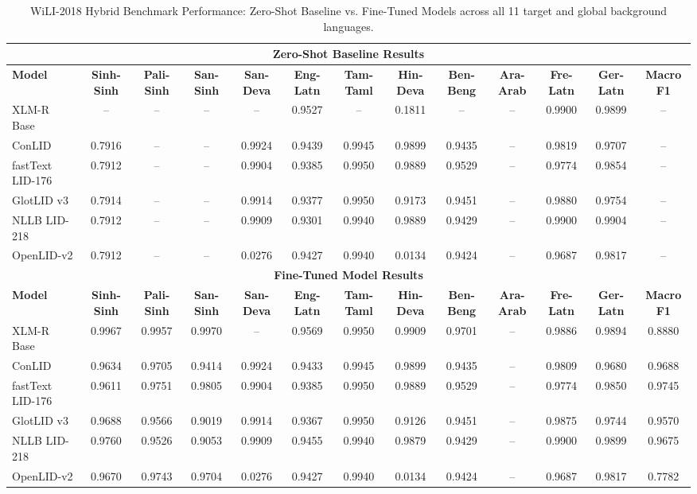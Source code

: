 \documentclass[11pt]{article}
\begin{document}
\begin{table}[p]
\vspace{12pt}

\caption{WiLI-2018 Hybrid Benchmark Performance: Zero-Shot Baseline vs. Fine-Tuned Models across all 11 target and global background languages.}
\label{tab:wili_full}
\begin{tabular}{l ccc cccccccc c}
\toprule
\multicolumn{13}{c}{\textbf{Zero-Shot Baseline Results}} \\
\midrule
\textbf{Model} & \textbf{Sinh-Sinh} & \textbf{Pali-Sinh} & \textbf{San-Sinh} & \textbf{San-Deva} & \textbf{Eng-Latn} & \textbf{Tam-Taml} & \textbf{Hin-Deva} & \textbf{Ben-Beng} & \textbf{Ara-Arab} & \textbf{Fre-Latn} & \textbf{Ger-Latn} & \textbf{Macro F1} \\
\midrule
XLM-R Base & -- & -- & -- & -- & 0.9527 & -- & 0.1811 & -- & -- & 0.9900 & 0.9899 & -- \\
ConLID & 0.7916 & -- & -- & 0.9924 & 0.9439 & 0.9945 & 0.9899 & 0.9435 & -- & 0.9819 & 0.9707 & -- \\
fastText LID-176 & 0.7912 & -- & -- & 0.9904 & 0.9385 & 0.9950 & 0.9889 & 0.9529 & -- & 0.9774 & 0.9854 & -- \\
GlotLID v3 & 0.7914 & -- & -- & 0.9914 & 0.9377 & 0.9950 & 0.9173 & 0.9451 & -- & 0.9880 & 0.9754 & -- \\
NLLB LID-218 & 0.7912 & -- & -- & 0.9909 & 0.9301 & 0.9940 & 0.9889 & 0.9429 & -- & 0.9900 & 0.9904 & -- \\
OpenLID-v2 & 0.7912 & -- & -- & 0.0276 & 0.9427 & 0.9940 & 0.0134 & 0.9424 & -- & 0.9687 & 0.9817 & -- \\
\midrule
\multicolumn{13}{c}{\textbf{Fine-Tuned Model Results}} \\
\midrule
\textbf{Model} & \textbf{Sinh-Sinh} & \textbf{Pali-Sinh} & \textbf{San-Sinh} & \textbf{San-Deva} & \textbf{Eng-Latn} & \textbf{Tam-Taml} & \textbf{Hin-Deva} & \textbf{Ben-Beng} & \textbf{Ara-Arab} & \textbf{Fre-Latn} & \textbf{Ger-Latn} & \textbf{Macro F1} \\
\midrule
XLM-R Base & 0.9967 & 0.9957 & 0.9970 & -- & 0.9569 & 0.9950 & 0.9909 & 0.9701 & -- & 0.9886 & 0.9894 & 0.8880 \\
ConLID & 0.9634 & 0.9705 & 0.9414 & 0.9924 & 0.9433 & 0.9945 & 0.9899 & 0.9435 & -- & 0.9809 & 0.9680 & 0.9688 \\
fastText LID-176 & 0.9611 & 0.9751 & 0.9805 & 0.9904 & 0.9385 & 0.9950 & 0.9889 & 0.9529 & -- & 0.9774 & 0.9850 & 0.9745 \\
GlotLID v3 & 0.9688 & 0.9566 & 0.9019 & 0.9914 & 0.9367 & 0.9950 & 0.9126 & 0.9451 & -- & 0.9875 & 0.9744 & 0.9570 \\
NLLB LID-218 & 0.9760 & 0.9526 & 0.9053 & 0.9909 & 0.9455 & 0.9940 & 0.9879 & 0.9429 & -- & 0.9900 & 0.9899 & 0.9675 \\
OpenLID-v2 & 0.9670 & 0.9743 & 0.9704 & 0.0276 & 0.9427 & 0.9940 & 0.0134 & 0.9424 & -- & 0.9687 & 0.9817 & 0.7782 \\
\bottomrule
\end{tabular}
\end{table}

\end{document}
